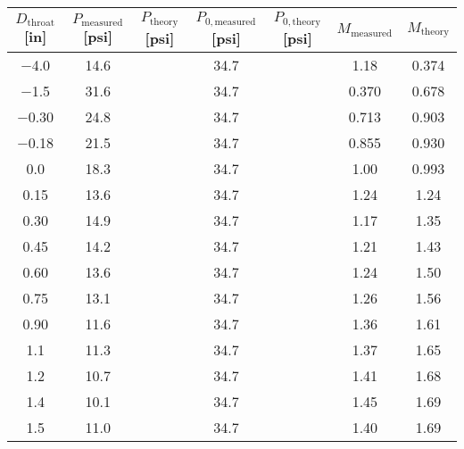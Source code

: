 \begin{tabular}{ccccccc}
\toprule
$D_\text{throat}$ [\unit{in}] & $P_\text{measured}$ [\unit{psi}] & $P_\text{theory}$ [\unit{psi}] & $P_{0,\text{measured}}$ [\unit{psi}] & $P_{0,\text{theory}}$ [\unit{psi}] & $M_\text{measured}$ & $M_\text{theory}$ \\
\midrule
\num{-4.0} & \num{14.6} &  & \num{34.7} &  & \num{1.18} & \num{0.374} \\ 
\num{-1.5} & \num{31.6} &  & \num{34.7} &  & \num{0.370} & \num{0.678} \\ 
\num{-0.30} & \num{24.8} &  & \num{34.7} &  & \num{0.713} & \num{0.903} \\ 
\num{-0.18} & \num{21.5} &  & \num{34.7} &  & \num{0.855} & \num{0.930} \\ 
\num{0.0} & \num{18.3} &  & \num{34.7} &  & \num{1.00} & \num{0.993} \\ 
\num{0.15} & \num{13.6} &  & \num{34.7} &  & \num{1.24} & \num{1.24} \\ 
\num{0.30} & \num{14.9} &  & \num{34.7} &  & \num{1.17} & \num{1.35} \\ 
\num{0.45} & \num{14.2} &  & \num{34.7} &  & \num{1.21} & \num{1.43} \\ 
\num{0.60} & \num{13.6} &  & \num{34.7} &  & \num{1.24} & \num{1.50} \\ 
\num{0.75} & \num{13.1} &  & \num{34.7} &  & \num{1.26} & \num{1.56} \\ 
\num{0.90} & \num{11.6} &  & \num{34.7} &  & \num{1.36} & \num{1.61} \\ 
\num{1.1} & \num{11.3} &  & \num{34.7} &  & \num{1.37} & \num{1.65} \\ 
\num{1.2} & \num{10.7} &  & \num{34.7} &  & \num{1.41} & \num{1.68} \\ 
\num{1.4} & \num{10.1} &  & \num{34.7} &  & \num{1.45} & \num{1.69} \\ 
\num{1.5} & \num{11.0} &  & \num{34.7} &  & \num{1.40} & \num{1.69} \\ 
\bottomrule
\end{tabular}